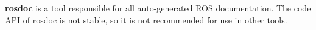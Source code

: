 

{\bfseries rosdoc} is a tool responsible for all auto-\/generated R\+OS documentation. The code A\+PI of rosdoc is not stable, so it is not recommended for use in other tools. 